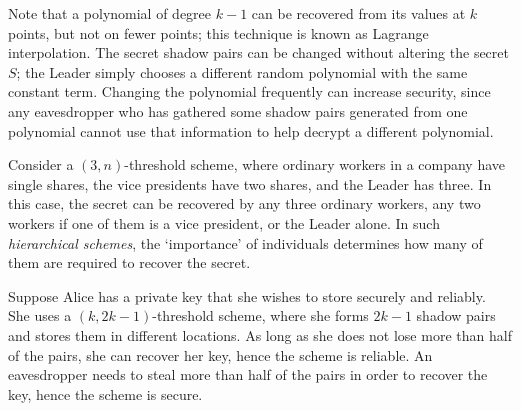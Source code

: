 \begin{remark}
    Note that a polynomial of degree \( k - 1 \) can be recovered from its values at \( k \) points, but not on fewer points; this technique is known as Lagrange interpolation.
    The secret shadow pairs can be changed without altering the secret \( S \); the Leader simply chooses a different random polynomial with the same constant term.
    Changing the polynomial frequently can increase security, since any eavesdropper who has gathered some shadow pairs generated from one polynomial cannot use that information to help decrypt a different polynomial.
\end{remark}
\begin{example}
    Consider a \( (3, n) \)-threshold scheme, where ordinary workers in a company have single shares, the vice presidents have two shares, and the Leader has three.
    In this case, the secret can be recovered by any three ordinary workers, any two workers if one of them is a vice president, or the Leader alone.
    In such \emph{hierarchical schemes}, the `importance' of individuals determines how many of them are required to recover the secret.
\end{example}
\begin{example}
    Suppose Alice has a private key that she wishes to store securely and reliably.
    She uses a \( (k, 2k-1) \)-threshold scheme, where she forms \( 2k-1 \) shadow pairs and stores them in different locations.
    As long as she does not lose more than half of the pairs, she can recover her key, hence the scheme is reliable.
    An eavesdropper needs to steal more than half of the pairs in order to recover the key, hence the scheme is secure.
\end{example}

